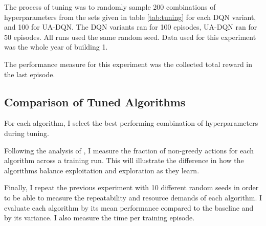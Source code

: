 The process of tuning was to randomly sample 200 combinations of hyperparameters from the sets given in table \ref{tab:tuning} for each DQN variant, and 100 for UA-DQN.
The DQN variants ran for 100 episodes, UA-DQN ran for 50 episodes.
All runs used the same random seed.
Data used for this experiment was the whole year of building 1.

The performance measure for this experiment was the collected total reward in the last episode.

\subsection{Comparison of Tuned Algorithms}
For each algorithm, I select the best performing combination of hyperparameters during tuning.

Following the analysis of \cite{clements2020EstimatingRiskUncertainty}, I measure the fraction of non-greedy actions for each algorithm across a training run.
This will illustrate the difference in how the algorithms balance exploitation and exploration as they learn.

Finally, I repeat the previous experiment with 10 different random seeds in order to be able to measure the repeatability and resource demands of each algorithm.
I evaluate each algorithm by its mean performance compared to the baseline and by its variance.
I also measure the time per training episode.